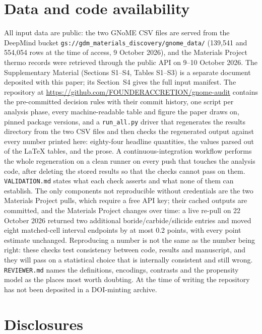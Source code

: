 \documentclass[11pt]{article}
\begin{document}
\section*{Data and code availability}

All input data are public: the two GNoME CSV files are served from the DeepMind bucket
\texttt{gs://gdm\_materials\_discovery/gnome\_data/} (139{,}541 and 554{,}054 rows at the
time of access, 9 October 2026), and the Materials Project thermo records were retrieved
through the public API on 9--10 October 2026. The Supplementary Material (Sections S1--S4, Tables S1--S3) is a separate
document deposited with this paper; its Section~S4 gives the full
input manifest. The repository at \url{https://github.com/FOUNDERACCRETION/gnome-audit}
contains the pre-committed decision rules with their commit history, one script per
analysis phase, every machine-readable table and figure the paper draws on, pinned
package versions, and a \texttt{run\_all.py} driver that regenerates the results
directory from the two CSV files and then checks the regenerated output against every
number printed here: eighty-four headline quantities, the values parsed out of the
\LaTeX{} tables, and the prose. A continuous-integration workflow performs the whole
regeneration on a clean runner on every push that touches the analysis code, after
deleting the stored results so that the checks cannot pass on them.
\texttt{VALIDATION.md} states what each check asserts and what none of them can
establish. The only components not reproducible without credentials are the two
Materials Project pulls, which require a free API key; their cached outputs are
committed, and the Materials Project changes over time: a live re-pull on 22 October
2026 returned two additional boride/carbide/silicide entries and moved eight matched-cell
interval endpoints by at most 0.2 points, with every point estimate unchanged. Reproducing a number is not the same as the number being right: these checks
test consistency between code, results and manuscript, and they will pass on a
statistical choice that is internally consistent and still wrong. \texttt{REVIEWER.md}
names the definitions, encodings, contrasts and the propensity model as the places most
worth doubting. At the time of writing the repository has not been deposited in a DOI-minting
archive.

\section*{Disclosures}
\end{document}
